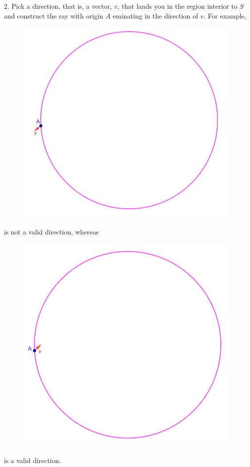 \documentclass[11pt]{amsart}
\theoremstyle{plain}
\theoremstyle{definition}
\theoremstyle{remark}
\begin{document}
2. Pick a direction, that is, a vector, \(v\), that lands you in the region interior to \(S\) and construct the ray with origin \(A\) eminating in the direction of \(v\).  For example,
\begin{center}
	\begin{figure}[h]
		\includegraphics[scale=0.6]{circle_2.jpg}
	\end{figure}
\end{center}
is not a valid direction, whereas
\begin{center}
	\begin{figure}[h]
		\includegraphics[scale=0.59]{circle_3.jpg}
	\end{figure}
\end{center}
is a valid direction.
\end{document}
